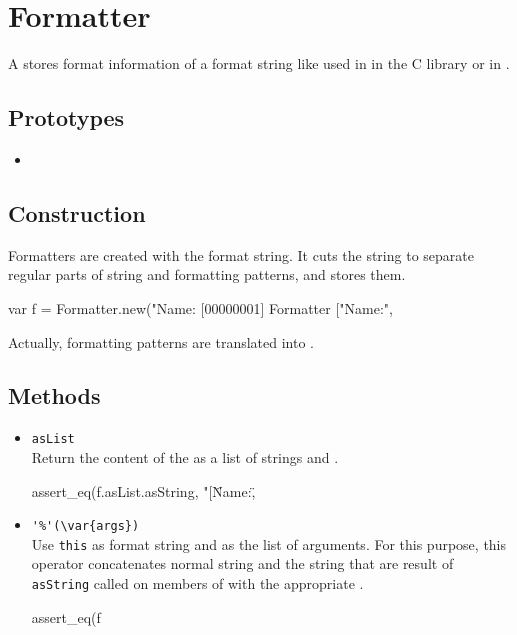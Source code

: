\section{Formatter}

A  stores format information of a format string like
used in  in the C library or in .

\subsection{Prototypes}

\begin{itemize}
\item {}
\end{itemize}

\subsection{Construction}

Formatters are created with the format string. It cuts the string to
separate regular parts of string and formatting patterns, and stores
them.

\begin{urbiscript}
var f = Formatter.new("Name:%
[00000001] Formatter ["Name:", %
\end{urbiscript}

Actually, formatting patterns are translated into
.

\subsection{Methods}

\begin{itemize}
\item \lstinline|asList|\\
  Return the content of the  as a list of strings and
  .
\begin{urbiscript}[firstnumber=last]
assert_eq(f.asList.asString, "[\"Name:\", %
\end{urbiscript}

\item \lstinline|'%'(\var{args})|\\
  Use \lstinline|this| as format string and  as the list of
  arguments.  For this purpose, this operator concatenates normal
  string and the string that are result of \lstinline|asString| called
  on members of  with the appropriate
  .
\begin{urbiscript}[firstnumber=last]
assert_eq(f %
\end{urbiscript}

\end{itemize}
